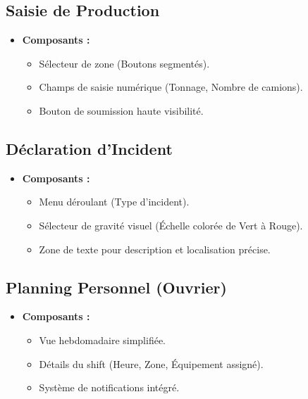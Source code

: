 \documentclass[12pt,a4paper]{article}
\begin{document}
\begin{itemize}[label=\textbullet]
\subsection{Saisie de Production}
\begin{itemize}[label=\textbullet]
    \item \textbf{Composants :}
    \begin{itemize}
        \item Sélecteur de zone (Boutons segmentés).
        \item Champs de saisie numérique (Tonnage, Nombre de camions).
        \item Bouton de soumission haute visibilité.
    \end{itemize}
\end{itemize}

\subsection{Déclaration d'Incident}
\begin{itemize}[label=\textbullet]
    \item \textbf{Composants :}
    \begin{itemize}
        \item Menu déroulant (Type d'incident).
        \item Sélecteur de gravité visuel (Échelle colorée de Vert à Rouge).
        \item Zone de texte pour description et localisation précise.
    \end{itemize}
\end{itemize}

\subsection{Planning Personnel (Ouvrier)}
\begin{itemize}[label=\textbullet]
    \item \textbf{Composants :}
    \begin{itemize}
        \item Vue hebdomadaire simplifiée.
        \item Détails du shift (Heure, Zone, Équipement assigné).
        \item Système de notifications intégré.
    \end{itemize}
\end{itemize}


\end{itemize}
\end{document}
